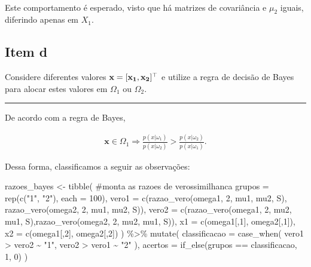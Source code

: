 \documentclass[
  a4paperpaper,
]{article}
\newenvironment{Shaded}{\begin{snugshade}}{\end{snugshade}}
\newcommand{\AttributeTok}[1]{\textcolor[rgb]{0.40,0.45,0.13}{#1}}
\newcommand{\CommentTok}[1]{\textcolor[rgb]{0.37,0.37,0.37}{#1}}
\newcommand{\DecValTok}[1]{\textcolor[rgb]{0.68,0.00,0.00}{#1}}
\newcommand{\FunctionTok}[1]{\textcolor[rgb]{0.28,0.35,0.67}{#1}}
\newcommand{\NormalTok}[1]{\textcolor[rgb]{0.00,0.23,0.31}{#1}}
\newcommand{\OtherTok}[1]{\textcolor[rgb]{0.00,0.23,0.31}{#1}}
\newcommand{\SpecialCharTok}[1]{\textcolor[rgb]{0.37,0.37,0.37}{#1}}
\newcommand{\StringTok}[1]{\textcolor[rgb]{0.13,0.47,0.30}{#1}}
\begin{document}
~

Este comportamento é esperado, visto que há matrizes de covariância e
\(\mu_2\) iguais, diferindo apenas em \(X_1\).

\subsection{Item d}\label{item-d}

Considere diferentes valores \(\bf{x} = [x_1 , x_2]^\top\) e utilize a
regra de decisão de Bayes para alocar estes valores em \(\Omega_1\) ou
\(\Omega_2\).

\begin{center}\rule{0.5\linewidth}{0.5pt}\end{center}

De acordo com a regra de Bayes,

\begin{align}
  \boldsymbol{x} \in \Omega_1 \Rightarrow \frac{p(x| \omega_1)}{p(x| \omega_2)} > \frac{p(x| \omega_2)}{p(x| \omega_1)}.
\end{align}

Dessa forma, classificamos a seguir as observações:

\begin{Shaded}
\begin{Highlighting}[]
\NormalTok{razoes\_bayes }\OtherTok{\textless{}{-}} \FunctionTok{tibble}\NormalTok{( }\CommentTok{\#monta as razoes de verossimilhanca}
  \AttributeTok{grupos =} \FunctionTok{rep}\NormalTok{(}\FunctionTok{c}\NormalTok{(}\StringTok{"1"}\NormalTok{, }\StringTok{"2"}\NormalTok{), }\AttributeTok{each =} \DecValTok{100}\NormalTok{),}
  \AttributeTok{vero1 =} \FunctionTok{c}\NormalTok{(}\FunctionTok{razao\_vero}\NormalTok{(omega1, }\DecValTok{2}\NormalTok{, mu1, mu2, S), }\FunctionTok{razao\_vero}\NormalTok{(omega2, }\DecValTok{2}\NormalTok{, mu1, mu2, S)),}
  \AttributeTok{vero2 =} \FunctionTok{c}\NormalTok{(}\FunctionTok{razao\_vero}\NormalTok{(omega1, }\DecValTok{2}\NormalTok{, mu2, mu1, S),}\FunctionTok{razao\_vero}\NormalTok{(omega2, }\DecValTok{2}\NormalTok{, mu2, mu1, S)),}
  \AttributeTok{x1 =} \FunctionTok{c}\NormalTok{(omega1[,}\DecValTok{1}\NormalTok{], omega2[,}\DecValTok{1}\NormalTok{]),}
  \AttributeTok{x2 =} \FunctionTok{c}\NormalTok{(omega1[,}\DecValTok{2}\NormalTok{], omega2[,}\DecValTok{2}\NormalTok{])}
\NormalTok{  ) }\SpecialCharTok{\%\textgreater{}\%}
  \FunctionTok{mutate}\NormalTok{(}
    \AttributeTok{classificacao =} \FunctionTok{case\_when}\NormalTok{(}
\NormalTok{      vero1 }\SpecialCharTok{\textgreater{}}\NormalTok{ vero2 }\SpecialCharTok{\textasciitilde{}} \StringTok{"1"}\NormalTok{,}
\NormalTok{      vero2 }\SpecialCharTok{\textgreater{}}\NormalTok{ vero1 }\SpecialCharTok{\textasciitilde{}} \StringTok{"2"}
\NormalTok{    ),}
    \AttributeTok{acertos =} \FunctionTok{if\_else}\NormalTok{(grupos }\SpecialCharTok{==}\NormalTok{ classificacao, }\DecValTok{1}\NormalTok{, }\DecValTok{0}\NormalTok{)}
\NormalTok{  )}
\end{Highlighting}
\end{Shaded}
\end{document}
